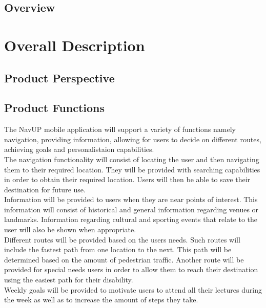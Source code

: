 \documentclass[12pt,a4paper]{report}
\begin{document}
	
	\subsection*{Overview}
		

\newpage
\section*{Overall Description}
	\subsection*{Product Perspective}
	\subsection*{Product Functions}
	The NavUP mobile application will support a variety of functions namely navigation, providing information, allowing for users to decide on different routes, achieving goals and personalistaion capabilities.
\\

The navigation functionality will consist of locating the user and then navigating them to their required location. They will be provided with searching capabilities in order to obtain their required location. Users will then be able to save their destination for future use.
\\

Information will be provided to users when they are near points of interest. This information will consist of historical and general information regarding venues or landmarks. Information regarding cultural and sporting events that relate to the user will also be shown when appropriate.
\\

Different routes will be provided based on the users needs. Such routes will include the fastest path from one location to the next. This path will be determined based on the amount of pedestrian traffic. Another route will be provided for special needs users in order to allow them to reach their destination using the easiest path for their disability. 
\\

Weekly goals will be provided to motivate users to attend all their lectures during the week as well as to increase the amount of steps they take.
\end{document}
